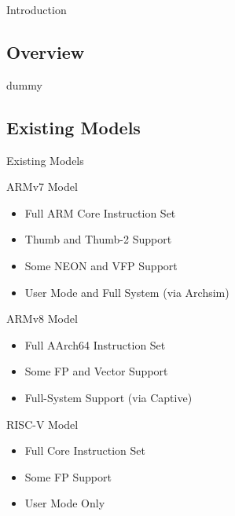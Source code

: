 \begin{frame}{Introduction}

\end{frame}

\begin{frame}
	\tableofcontents
\end{frame}	

\subsection{Overview}

\begin{frame}{dummy}\end{frame}

\subsection{Existing Models}

\begin{frame}{Existing Models}

\end{frame}

\begin{frame}{ARMv7 Model}

\begin{itemize}
	\item Full ARM Core Instruction Set
	\item Thumb and Thumb-2 Support
	\item Some NEON and VFP Support
	\item User Mode and Full System (via Archsim)
\end{itemize}

\end{frame}

\begin{frame}{ARMv8 Model}

\begin{itemize}
	\item Full AArch64 Instruction Set
	\item Some FP and Vector Support
	\item Full-System Support (via Captive)
\end{itemize}

\end{frame}

\begin{frame}{RISC-V Model}

\begin{itemize}
	\item Full Core Instruction Set
	\item Some FP Support
	\item User Mode Only
\end{itemize}

\end{frame}
